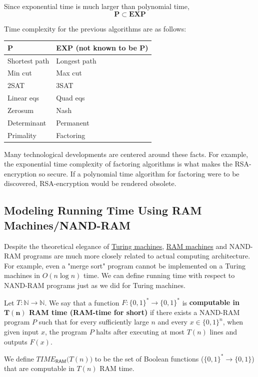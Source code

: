   \begin{lemma}
    \label{thm:psubseteqexp}
  Since exponential time is much larger than polynomial time, 
  \begin{equation}
    \mathbf{P} \subset \mathbf{EXP}
  \end{equation}
  \end{lemma}

  Time complexity for the previous algorithms are as follows: 
  \begin{center}
  \begin{tabular}{l|l}
      \textbf{P} & \textbf{EXP} (not known to be \textbf{P}) \\
      \hline
      Shortest path & Longest path \\
      Min cut & Max cut \\
      2SAT & 3SAT \\
      Linear eqs & Quad eqs \\
      Zerosum & Nash \\
      Determinant & Permanent\\
      Primality & Factoring
  \end{tabular}
  \end{center}
  Many technological developments are centered around these facts. For example, the exponential time complexity of factoring algorithms is what makes the RSA-encryption so secure. If a polynomial time algorithm for factoring were to be discovered, RSA-encryption would be rendered obsolete. 

\subsection{Modeling Running Time Using RAM Machines/NAND-RAM}

  Despite the theoretical elegance of \hyperref[def:turing-machine]{Turing machines}, \hyperref[def:ram-machine]{RAM machines} and NAND-RAM programs are much more closely related to actual computing architecture. For example, even a "merge sort" program cannot be implemented on a Turing machines in $O(n \log n)$ time. We can define running time with respect to NAND-RAM programs just as we did for Turing machines. 

  \begin{definition}
    \label{def:computable-in-ram-time-tn}
  Let $T: \mathbb{N} \to \mathbb{N}$. We say that a function $F: \{0,1\}^* \to \{0,1\}^*$ is \textbf{computable in $\mathbf{T(n)}$ RAM time (RAM-time for short)} if there exists a NAND-RAM program $P$ such that for every sufficiently large $n$ and every $x \in \{0,1\}^n$, when given input $x$, the program $P$ halts after executing at most $T(n)$ lines and outputs $F(x)$. 

  We define $TIME_{\mathsf{RAM}} \big(T(n)\big)$ to be the set of Boolean functions ($\{0,1\}^* \to \{0,1\}$) that are computable in $T(n)$ RAM time. 
  \end{definition}

